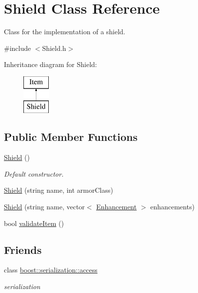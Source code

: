 \hypertarget{class_shield}{}\section{Shield Class Reference}
\label{class_shield}


Class for the implementation of a shield.  




{\ttfamily \#include $<$Shield.\+h$>$}

Inheritance diagram for Shield\+:\begin{figure}[H]
\begin{center}
\leavevmode
\includegraphics[height=2.000000cm]{class_shield}
\end{center}
\end{figure}
\subsection*{Public Member Functions}
\begin{DoxyCompactItemize}
\item 
\hypertarget{class_shield_a8a6e827c94750d8c1a1d523cb1b105de}{}\label{class_shield_a8a6e827c94750d8c1a1d523cb1b105de} 
\hyperlink{class_shield_a8a6e827c94750d8c1a1d523cb1b105de}{Shield} ()
\begin{DoxyCompactList}\small\item\em Default constructor. \end{DoxyCompactList}\item 
\hyperlink{class_shield_ab14292c5626c5f10a57e727ca298ee49}{Shield} (string name, int armor\+Class)
\item 
\hyperlink{class_shield_ad95eb094f4ed92a7f59694d9a5939565}{Shield} (string name, vector$<$ \hyperlink{class_enhancement}{Enhancement} $>$ enhancements)
\item 
bool \hyperlink{class_shield_af28f146ed96720bd007a62a5871cd206}{validate\+Item} ()
\end{DoxyCompactItemize}
\subsection*{Friends}
\begin{DoxyCompactItemize}
\item 
\hypertarget{class_shield_ac98d07dd8f7b70e16ccb9a01abf56b9c}{}\label{class_shield_ac98d07dd8f7b70e16ccb9a01abf56b9c} 
class \hyperlink{class_shield_ac98d07dd8f7b70e16ccb9a01abf56b9c}{boost\+::serialization\+::access}
\begin{DoxyCompactList}\small\item\em serialization \end{DoxyCompactList}\end{DoxyCompactItemize}
